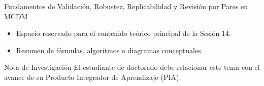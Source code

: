 \documentclass[aspectratio=169, 10pt]{beamer}
\begin{document}
\begin{frame}{Fundamentos de Validación, Robustez, Replicabilidad y Revisión por Pares en MCDM}
    \begin{itemize}
        \item Espacio reservado para el contenido teórico principal de la Sesión 14.
        \item Resumen de fórmulas, algoritmos o diagramas conceptuales.
    \end{itemize}
    \begin{block}{Nota de Investigación}
        El estudiante de doctorado debe relacionar este tema con el avance de su Producto Integrador de Aprendizaje (PIA).
    \end{block}
\end{frame}
\end{document}
